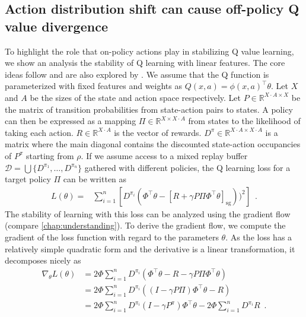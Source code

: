\subsection{Action distribution shift can cause off-policy Q value divergence}
\label{sec:mad:theory}
To highlight the role that on-policy actions play in stabilizing Q value learning, we show an analysis the stability of Q learning with linear features.
The core ideas follow \textcite{sutton2016emphatic} and are also explored by \textcite{tsitsiklis1996analysis,sutton1988learning}.
We assume that the Q function is parameterized with fixed features and weights as $Q(x,a) = \phi(x,a)^\top \theta$.
Let $X$ and $A$ be the sizes of the state and action space respectively. Let $P \in \mathbb{R}^{X\cdot A \times X}$ be the matrix of transition probabilities from state-action pairs to states.
A policy can then be expressed as a mapping $\Pi \in \mathbb{R}^{X\times X\cdot A}$ from states to the likelihood of taking each action.
$R \in \mathbb{R}^{X\cdot A}$ is the vector of rewards.
$D^{\pi} \in \mathbb{R}^{X\cdot A \times X\cdot A}$ is a matrix where the main diagonal contains the discounted state-action occupancies of $P^\pi$ starting from $\rho$.
If we assume access to a mixed replay buffer $\mathcal{D} = \bigcup \{D^{\pi_1}, \dots, D^{\pi_n}\}$ gathered with different policies, the Q learning loss for a target policy $\Pi$ can be written as
\begin{align}
    L(\theta) = & \sum_{i=1}^n \left[D^{\pi_i}\left(\Phi^\top \theta - [R + \gamma P\Pi \Phi^\top \theta]_\mathrm{sg}\right))^2\right] \enspace.
\end{align}
The stability of learning with this loss can be analyzed using the gradient flow (compare \autoref{chap:understanding}).
To derive the gradient flow, we compute the gradient of the loss function with regard to the parameters $\theta$.
As the loss has a relatively simple quadratic form and the derivative is a linear transformation, it decomposes nicely as
\begin{align}
    \nabla_\theta L(\theta) &= 2 \Phi \sum_{i=1}^n D^{\pi_i} \left(\Phi^\top \theta - R - \gamma P \Pi \Phi^\top \theta\right)\\
    &= 2 \Phi \sum_{i=1}^n D^{\pi_i} \left(\left(I - \gamma P \Pi \right)\Phi^\top \theta - R\right)\\
    &= 2 \Phi \sum_{i=1}^n D^{\pi_i} \left(I - \gamma P^\pi \right)\Phi^\top \theta - 2 \Phi \sum_{i=1}^n D^{\pi_i} R\enspace.
\end{align}

